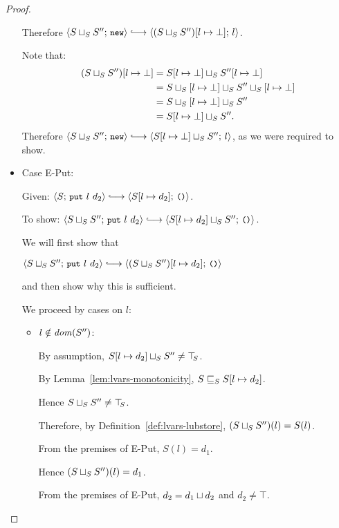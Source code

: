 \begin{proof}
\begin{itemize}
    Therefore $\config{\lubstore{S}{S''}}{\NEW} \parstepsto
    \config{\extSRaw{(\lubstore{S}{S''})}{l}{\bot}}{l}$.

    Note that:
    \begin{align*}
      (S \sqcup_{S} S'')[l \mapsto \bot] &=
      S[l \mapsto \bot] \sqcup_{S} S''[l \mapsto \bot] \\ &=
      S \sqcup_{S} \left[ l \mapsto \bot \right] \sqcup_{S} S'' \sqcup_{S} \left[ l \mapsto \bot \right]
      \\ &=
      S \sqcup_{S} \left[ l \mapsto \bot \right] \sqcup_{S} S''
      \\ &= S[l \mapsto \bot] \sqcup_{S} S''.
    \end{align*}
    Therefore $\config{\lubstore{S}{S''}}{\NEW} \parstepsto
    \config{\lubstore{\extSRaw{S}{l}{\bot}}{S''}}{l}$, as we were
    required to show.

  \item Case {\sc E-Put}:

    Given: $\config{S}{\putexp{l}{d_2}} \parstepsto
    \config{\extSRaw{S}{l}{d_2}}{\unit}$.

    To show: $\config{\lubstore{S}{S''}}{\putexp{l}{d_2}} \parstepsto
    \config{\lubstore{\extSRaw{S}{l}{d_2}}{S''}}{\unit}$.

    We will first show that

    $\config{\lubstore{S}{S''}}{\putexp{l}{d_2}} \parstepsto
    \config{\extSRaw{(\lubstore{S}{S''})}{l}{d_2}}{\unit}$

    and then show why this is sufficient.

    We proceed by cases on $l$:

    \begin{itemize}
    \item $l \notin \mathit{dom}(S'')$:

      By assumption, $S[l \mapsto d_2] \sqcup_{S} S'' \neq \top\hspace{-0.85mm}_{S}$.

      By Lemma~\ref{lem:lvars-monotonicity},
      $S \sqsubseteq_S S[l \mapsto d_2]$.

      Hence $S \sqcup_{S} S'' \neq \top\hspace{-0.85mm}_{S}$.

      Therefore, by Definition~\ref{def:lvars-lubstore},
      $(S \sqcup_{S} S'')(l) = S(l)$.

      From the premises of {\sc E-Put}, $S(l) = d_1$.

      Hence $(S \sqcup_{S} S'')(l) = d_1$.

      From the premises of {\sc E-Put}, $d_2 = d_1 \sqcup d_2$
      and $d_2 \neq \top$.


\end{itemize}
\end{itemize}
\end{proof}

